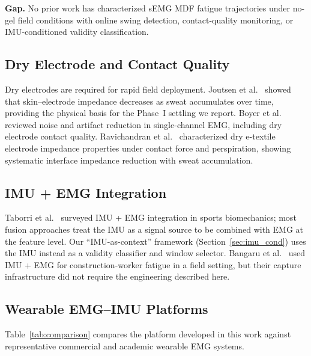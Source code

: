 \documentclass[sensors,article,submit,pdftex,moreauthors]{Definitions/mdpi}
\begin{document}
\textbf{Gap.} No prior work has characterized sEMG MDF fatigue trajectories under
no-gel field conditions with online swing detection, contact-quality monitoring, or
IMU-conditioned validity classification.

\subsection{Dry Electrode and Contact Quality}

Dry electrodes are required for rapid field deployment. Joutsen et al.~\cite{joutsen2024}
showed that skin--electrode impedance decreases as sweat accumulates over time,
providing the physical basis for the Phase~I settling we report. Boyer et
al.~\cite{boyer2023} reviewed noise and artifact reduction in single-channel EMG,
including dry electrode contact quality. Ravichandran et al.~\cite{ravichandran2023}
characterized dry e-textile electrode impedance properties under contact force and
perspiration, showing systematic interface impedance reduction with sweat accumulation.

\subsection{IMU + EMG Integration}

Taborri et al.~\cite{taborri2020} surveyed IMU + EMG integration in sports biomechanics;
most fusion approaches treat the IMU as a signal source to be combined with EMG at the
feature level. Our ``IMU-as-context'' framework (Section~\ref{sec:imu_cond}) uses the
IMU instead as a validity classifier and window selector. Bangaru et
al.~\cite{bangaru2022} used IMU + EMG for construction-worker fatigue in a field
setting, but their capture infrastructure did not require the engineering described here.

\subsection{Wearable EMG--IMU Platforms}

Table~\ref{tab:comparison} compares the platform developed in this work against
representative commercial and academic wearable EMG systems.
\end{document}
